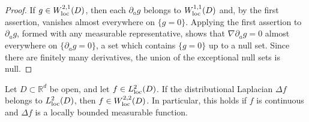 \begin{proof}
If $g\in W^{2,1}_{\mathrm{loc}}(D)$, then each $\partial_ag$ belongs to $W^{1,1}_{\mathrm{loc}}(D)$ and, by the first assertion, vanishes almost everywhere on $\{g=0\}$. Applying the first assertion to $\partial_ag$, formed with any measurable representative, shows that $\nabla\partial_ag=0$ almost everywhere on $\{\partial_ag=0\}$, a set which contains $\{g=0\}$ up to a null set. Since there are finitely many derivatives, the union of the exceptional null sets is null.
\end{proof}

\begin{lemma}\label{lem:bounded-laplacian-weak-hessian}
Let $D\subset\mathbb R^d$ be open, and let $f\in L^2_{\mathrm{loc}}(D)$. If the distributional Laplacian $\Delta f$ belongs to $L^2_{\mathrm{loc}}(D)$, then $f\in W^{2,2}_{\mathrm{loc}}(D)$. In particular, this holds if $f$ is continuous and $\Delta f$ is a locally bounded measurable function.
\end{lemma}
